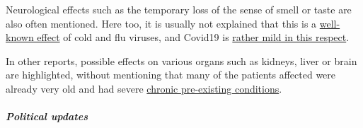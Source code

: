 Neurological effects such as the temporary loss of the sense of smell or
taste are also often mentioned. Here too, it is usually not explained
that this is a
\href{https://www.ncbi.nlm.nih.gov/pubmed/25294743}{well-known effect}
of cold and flu viruses, and Covid19 is
\href{https://www.ncbi.nlm.nih.gov/pubmed/23948436}{rather mild in this
respect}.

In other reports, possible effects on various organs such as kidneys,
liver or brain are highlighted, without mentioning that many of the
patients affected were already very old and had severe
\href{https://www.epicentro.iss.it/coronavirus/sars-cov-2-decessi-italia}{chronic
pre-existing conditions}.

\hypertarget{political-updates-1}{%
\subparagraph{\texorpdfstring{\textbf{Political
updates}}{Political updates}}\label{political-updates-1}}

